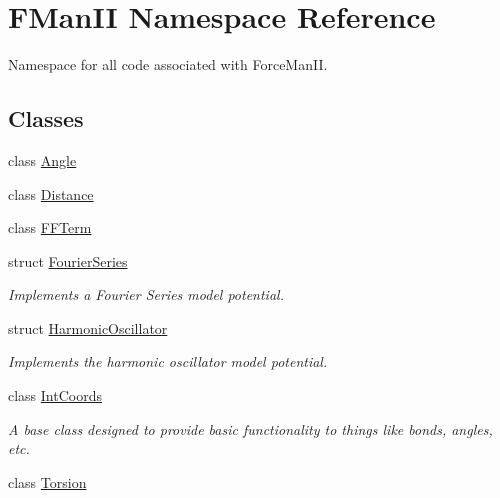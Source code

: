 \hypertarget{namespaceFManII}{}\section{F\+Man\+II Namespace Reference}
\label{namespaceFManII}


Namespace for all code associated with Force\+Man\+II.  


\subsection*{Classes}
\begin{DoxyCompactItemize}
\item 
class \hyperlink{classFManII_1_1Angle}{Angle}
\item 
class \hyperlink{classFManII_1_1Distance}{Distance}
\item 
class \hyperlink{classFManII_1_1FFTerm}{F\+F\+Term}
\item 
struct \hyperlink{structFManII_1_1FourierSeries}{Fourier\+Series}
\begin{DoxyCompactList}\small\item\em Implements a Fourier Series model potential. \end{DoxyCompactList}\item 
struct \hyperlink{structFManII_1_1HarmonicOscillator}{Harmonic\+Oscillator}
\begin{DoxyCompactList}\small\item\em Implements the harmonic oscillator model potential. \end{DoxyCompactList}\item 
class \hyperlink{classFManII_1_1IntCoords}{Int\+Coords}
\begin{DoxyCompactList}\small\item\em A base class designed to provide basic functionality to things like bonds, angles, etc. \end{DoxyCompactList}\item 
class \hyperlink{classFManII_1_1Torsion}{Torsion}
\end{DoxyCompactItemize}
